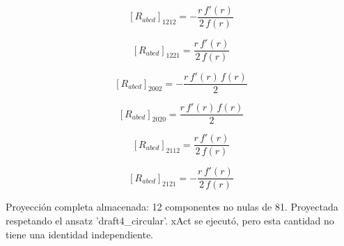 \documentclass[11pt]{article}
\begin{document}
\begin{dmath*}[breakdepth={5}]
\left[R_{abcd}\right]_{1212} = -\frac{r\,f'\!\left(r\right)}{2\,f\!\left(r\right)}
\end{dmath*}
\par\smallskip
\begin{dmath*}[breakdepth={5}]
\left[R_{abcd}\right]_{1221} = \frac{r\,f'\!\left(r\right)}{2\,f\!\left(r\right)}
\end{dmath*}
\par\smallskip
\begin{dmath*}[breakdepth={5}]
\left[R_{abcd}\right]_{2002} = -\frac{r\,f'\!\left(r\right)\,f\!\left(r\right)}{2}
\end{dmath*}
\par\smallskip
\begin{dmath*}[breakdepth={5}]
\left[R_{abcd}\right]_{2020} = \frac{r\,f'\!\left(r\right)\,f\!\left(r\right)}{2}
\end{dmath*}
\par\smallskip
\begin{dmath*}[breakdepth={5}]
\left[R_{abcd}\right]_{2112} = \frac{r\,f'\!\left(r\right)}{2\,f\!\left(r\right)}
\end{dmath*}
\par\smallskip
\begin{dmath*}[breakdepth={5}]
\left[R_{abcd}\right]_{2121} = -\frac{r\,f'\!\left(r\right)}{2\,f\!\left(r\right)}
\end{dmath*}
\par\smallskip
Proyección completa almacenada: 12 componentes no nulas de 81. Proyectada respetando el ansatz 'draft4\_circular'. xAct se ejecutó, pero esta cantidad no tiene una identidad independiente.\par\medskip
{}
\end{document}
